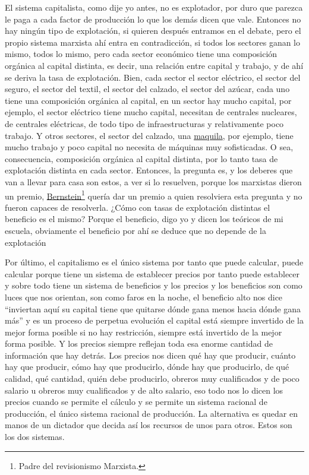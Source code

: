 El sistema capitalista, como dije yo antes, no es explotador, por duro que parezca le paga a cada factor de producción lo que los demás dicen que vale. Entonces no hay ningún tipo de explotación, si quieren después entramos en el debate, pero el propio sistema marxista ahí entra en contradicción, si todos los sectores ganan lo mismo, todos lo mismo, pero cada sector económico tiene una composición orgánica al capital distinta, es decir, una relación entre capital y trabajo, y de ahí se deriva la tasa de explotación. Bien, cada sector el sector eléctrico, el sector del seguro, el sector del textil, el sector del calzado, el sector del azúcar, cada uno tiene una composición orgánica al capital, en un sector hay mucho capital, por ejemplo, el sector eléctrico tiene mucho capital, necesitan de centrales nucleares, de centrales eléctricas, de todo tipo de infraestructuras y relativamente poco trabajo. Y otros sectores, el sector del calzado, una \href{https://en.wikipedia.org/wiki/Maquiladora}{maquila}, por ejemplo, tiene mucho trabajo y poco capital no necesita de máquinas muy sofisticadas. O sea, consecuencia, composición orgánica al capital distinta, por lo tanto tasa de explotación distinta en cada sector. Entonces, la pregunta es, y los deberes que van a llevar para casa son estos, a ver si lo resuelven, porque los marxistas dieron un premio, \href{https://en.wikipedia.org/wiki/Eduard_Bernstein}{Bernstein}\footnote{Padre del revisionismo Marxista.} quería dar un premio a quien resolviera esta pregunta y no fueron capaces de resolverla. ¿Cómo con tasas de explotación distintas el beneficio es el mismo? Porque el beneficio, digo yo y dicen los teóricos de mi escuela, obviamente el beneficio por ahí se deduce que no depende de la explotación

Por último, el capitalismo es el único sistema por tanto que puede calcular, puede calcular porque tiene un sistema de establecer precios por tanto puede establecer y sobre todo tiene un sistema de beneficios y los precios y los beneficios son como luces que nos orientan, son como faros en la noche, el beneficio alto nos dice \enquote{inviertan aquí su capital tiene que quitarse dónde gana menos hacia dónde gana más} y es un proceso de perpetua evolución el capital está siempre invertido de la mejor forma posible si no hay restricción, siempre está invertido de la mejor forma posible. Y los precios siempre reflejan toda esa enorme cantidad de información que hay detrás. Los precios nos dicen qué hay que producir, cuánto hay que producir, cómo hay que producirlo, dónde hay que producirlo, de qué calidad, qué cantidad, quién debe producirlo, obreros muy cualificados y de poco salario u obreros muy cualificados y de alto salario, eso todo nos lo dicen los precios cuando se permite el cálculo y se permite un sistema racional de producción, el único sistema racional de producción. La alternativa es quedar en manos de un dictador que decida así los recursos de unos para otros. Estos son los dos sistemas.

